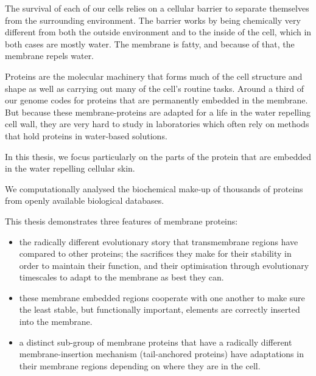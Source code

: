 \documentclass[12pt,PhD,twoside]{muthesis}
\begin{document}
The survival of each of our cells relies on a cellular barrier to separate themselves from the surrounding environment.
The barrier works by being chemically very different from both the outside environment and to the inside of the cell, which in both cases are mostly water.
The membrane is fatty, and because of that, the membrane repels water.

Proteins are the molecular machinery that forms much of the cell structure and shape as well as carrying out many of the cell's routine tasks.
Around a third of our genome codes for proteins that are permanently embedded in the membrane.
But because these membrane\--proteins are adapted for a life in the water repelling cell wall, they are very hard to study in laboratories which often rely on methods that hold proteins in water-based solutions.

In this thesis, we focus particularly on the parts of the protein that are embedded in the water repelling cellular skin.


We computationally analysed the biochemical make-up of thousands of proteins from openly available biological databases.

This thesis demonstrates three features of membrane proteins:
\begin{itemize}
  \item the radically different evolutionary story that transmembrane regions have compared to other proteins; the sacrifices they make for their stability in order to maintain their function, and their optimisation through evolutionary timescales to adapt to the membrane as best they can.
  \item these membrane embedded regions cooperate with one another to make sure the least stable, but functionally important, elements are correctly inserted into the membrane.
  \item a distinct sub-group of membrane proteins that have a radically different membrane-insertion mechanism (tail-anchored proteins) have adaptations in their membrane regions depending on where they are in the cell.
\end{itemize}
\end{document}
